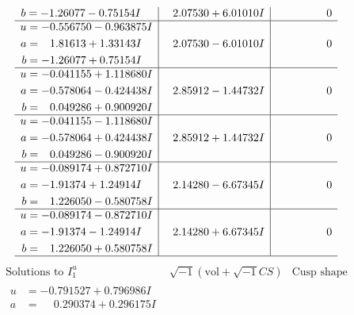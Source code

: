 \documentclass[1p]{elsarticle_modified}
\theoremstyle{definition}
\newcommand{\I}{\sqrt{-1}}
\begin{document}
$$\begin{array}{c|c|c}
\begin{aligned}
b &= -1.26077 - 0.75154 I\end{aligned}
 & \phantom{-}2.07530 + 6.01010 I & \phantom{-0.000000 } 0 \\ \hline\begin{aligned}
u &= -0.556750 - 0.963875 I \\
a &= \phantom{-}1.81613 + 1.33143 I \\
b &= -1.26077 + 0.75154 I\end{aligned}
 & \phantom{-}2.07530 - 6.01010 I & \phantom{-0.000000 } 0 \\ \hline\begin{aligned}
u &= -0.041155 + 1.118680 I \\
a &= -0.578064 - 0.424438 I \\
b &= \phantom{-}0.049286 + 0.900920 I\end{aligned}
 & \phantom{-}2.85912 - 1.44732 I & \phantom{-0.000000 } 0 \\ \hline\begin{aligned}
u &= -0.041155 - 1.118680 I \\
a &= -0.578064 + 0.424438 I \\
b &= \phantom{-}0.049286 - 0.900920 I\end{aligned}
 & \phantom{-}2.85912 + 1.44732 I & \phantom{-0.000000 } 0 \\ \hline\begin{aligned}
u &= -0.089174 + 0.872710 I \\
a &= -1.91374 + 1.24914 I \\
b &= \phantom{-}1.226050 - 0.580758 I\end{aligned}
 & \phantom{-}2.14280 - 6.67345 I & \phantom{-0.000000 } 0 \\ \hline\begin{aligned}
u &= -0.089174 - 0.872710 I \\
a &= -1.91374 - 1.24914 I \\
b &= \phantom{-}1.226050 + 0.580758 I\end{aligned}
 & \phantom{-}2.14280 + 6.67345 I & \phantom{-0.000000 } 0\\
 \hline 
 \end{array}$$\newpage$$\begin{array}{c|c|c}  
\text{Solutions to }I^u_{1}& \I (\text{vol} + \sqrt{-1}CS) & \text{Cusp shape}\\
 \hline 
\begin{aligned}
u &= -0.791527 + 0.796986 I \\
a &= \phantom{-}0.290374 + 0.296175 I \\

\end{aligned}
\end{array}$$
\end{document}
